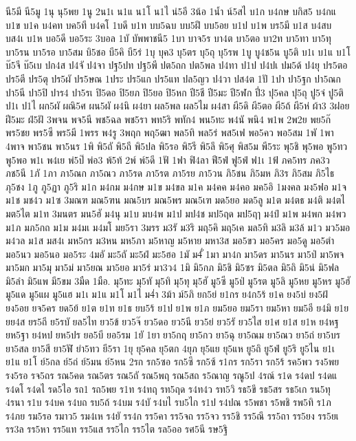 {นี5มี
นี5มู
1นุ
นุ5พย
1นู
2น1เ
น1แ
น1โ
น1ไ
น่5อี
3น้อ
1น้ำ
น์5สไ
บ1ก
บ4กษ
บกิส5
บ4กแ
บ1ข
บ1ค
บ4คท
บค5ที
บ4คโ
1บดี
บ1ท
บบ5ฉบ
บบ5ฝึ
บบ5อย
บ1ป
บ1พ
บร5มี
บ1ส
บ4สบ
บส4เ
บ1ห
บอ5ดี
บอ5ระ
3บอล
1บั
บัพพาชนี5
1บา
บาจ5ร
บา4ต
บา5ตอ
บา2ท
บา5ทา
บา5ทุ
บา5รน
บา5รอ
บา5สม
บิ5ชอ
บี5คิ
บี5ร่
1บุ
บุค3
บุ5ตร
บุ5ถุ
บุ5รพ
1บู
บู4ช5น
บู5ติ
บ1เ
บ1แ
บ1โ
บ๊5จี
บ๊5เบ
ปก4ส
ป4จั
ป4จา
ปฐ5ปท
ปฐ5พี
ปต5ถก
ปต5พล
ป4ทา
ป1ป
ป4ปเ
ปม5ด้
ป4ยุ
ปร5ตอ
ปร5ตี
ปร5ตุ
ปร5ผั
ปร5ษณ
1ประ
ปร5แก
ปร5แท
ปล5ญว
ป4วา
ปส4ต
1ปั
1ปา
ปา5ฐก
ปา5ณก
ปา5นี
ปา5ปิ
ปาร4
ปา5รเ
ปิ5ดอ
ปิ5ยภ
ปิ5ยอ
ปิ5หก
ปี5ชี
ปี5มะ
ปี5ฬก
ปี่3
ปุ5คล
ปุ5ถุ
ปู5จ๋
ปู5ติ
ป1เ
ป1ไ
ผก5ผั
ผณิ5ศ
ผน5ผั
ผ4นิ
ผ4ยา
ผล5พล
ผล5ไม
ผ4สา
ผี5ดิ
ผี5ตอ
ผี5ถ้
ผี5ห่
ผ้า3
3ฝอย
ฝี5มะ
ฝ่5ฝั
3พจน
พจ5นี
พช5ฉล
พช5รา
พท5ริ
พทัก4
พน5ทะ
พ4นั
พนิ4
พ1พ
2พ2ย
พย5ก๊
พร5ชย
พร5ซี
พร5มี
1พรร
พ4รู
3พฤก
พฤ5ฒา
พล5ทิ
พล5ร่
พส5เฟ
พอ5คว
พอ5สม
1พั
1พา
4พาจ
พา5ชน
พา5นร
1พิ
พิ5ถั
พิ5ถี
พิ5ปล
พิ5รอ
พิ5รี
พิ5ลึ
พิ5ศุ
พิส5ม
พี5ระ
พุ5ชิ
พุ5พอ
พู5ทว
พู5พอ
พ1เ
พ4เย
พ่5ป๊
พ่อ3
พ้5ท้
2พ์
พ์5ดี
1ฟั
1ฟา
ฟิ4ลา
ฟี5ฟ่
ฟู5ฟ่
ฟ1เ
1ฟ้
ภค5ทร
ภค3ว
ภช5นี
1ภั
1ภา
ภา5ณก
ภา5ณว
ภา5รด
ภา5รต
ภา5รย
ภา5วน
ภิ5ชน
ภิ5มห
ภิ3ร
ภิ5สม
ภิ5ไธ
ภุ5ชง
1ภู
ภู5ฏา
ภู5ริ
ม1ก
ม4กม
ม4กษ
ม1ข
ม4ขล
ม1ค
ม4คค
ม4คอ
มค5อิ
1มงคล
มง5ฟอ
ม1จ
ม1ช
มช4ว
ม1ซ
3มณฑ
มณ5ฑน
มณ5บร
มณ5พร
มณ5เฑ
มด5ยอ
มด5ลู
ม1ต
ม4ตธ
ม4ติ
ม4ตไ
มต5ไต
ม1ท
3มนตร
มน5ฮั
ม4นุ
ม1บ
มบ4พ
ม1ป
มป4ช
มป5ฤด
มป5ฤๅ
ม4ป์
ม1พ
ม4พก
ม4พว
ม1ภ
มภ5กถ
ม1ม
ม4มเ
ม4มโ
มย5รา
3มรร
ม3รั
ม3ริ
มฤ5คิ
มฤ5เค
มล5ทิ
ม3ลิ
ม3ล้
ม1ว
มว5มอ
ม4วล
ม1ส
มส4เ
มห5กร
ม3หน
มห5ภา
ม5หาญ
ม5หาย
มหา3ส
มอ5ขว
มอ5คร
มอ5ดู
มอ5ตำ
มอ5นว
มอ5นอ
มอ5ระ
4มอั
มะ5ถั
มะ5ฝ่
มะ5ฮอ
1มั
ม4ั่
1มา
มา4ก
มา5ดร
มา5นร
มา5ป่
มา5พจ
มา5มก
มา5มุ
มา5ม่
มา5ยณ
มา5ยอ
มา5ร่
มา3ว4
1มิ
มิ5กภ
มิ5ชิ
มิ5ซร
มิ5ตล
มิ5ถิ
มิ5น่
มิ5ฟล
มิ5ลำ
มิ5แพ
มี5ขม
3มืด
1มือ.
มุ5ทะ
มุ5ทั
มุ5ทิ
มุ5ทุ
มุ5ฮั
มู5ซี
มู5ป่
มู5รต
มู5ลิ
มู5หย
มู5หร
มู5ฮั
มู5แด
มู5แผ
มู5แฮ
ม1เ
ม1แ
ม1โ
ม1ไ
ม4่า
3ม้า
ม์5ภิ
ยก5ย่
ย1กร
ย4ก5ร้
ย1ค
ยง5บ่
ยง5ฝ้
ยง5อย
ยจ5คร
ยด5ย้
ย1ต
ย1ท
ย1ธ
ยบ5ร้
ย1ป
ย1พ
ย1ภ
ยม5ยอ
ยม5รา
ยม5หา
ยม5อี
ย4มิ
ย1ย
ยย4ส
ยร5ถี
ย5รบั
ยล5ไท
ยว5ข้
ยว5จ๊
ยว5ดอ
ยว5นี
ยว5ย่
ยว5รั
ยว5ไส
ย1ศ
ย1ส
ย1ห
ย4หฐ
ยห5ฐา
ย4หป
ยห5ปร
ยอ5บี
ยอ5รม
1ยั
1ยา
ยา5กฤ
ยา5กว
ยา5ฉุ
ยา5ณม
ยา5ณว
ยา5ถ่
ยา5บร
ยา5สล
ยา5สี
ยา5ฬั
ยำ5ทว
ยี5รา
1ยุ
ยุ5คล
ยุ5ตก
4ยุภ
ยุ5แย
ยุ5แห
ยู5ถิ
ยู5ฟ่
ยู5ริ
ยู5ไน
ย1เ
ย1แ
ย1โ
ย์5กล
ย์5ถ่
ย์5มน
ย์5หน
2รก
รก5ซอ
รก5ซึ
รก5ซ้
ร1กร
รก5รา
รก5ร้
รค5พว
รง5พย
รง5รอ
รจ5ถร
รณ5คด
รณ5ตร
รณ5ถั
รณ5พฤ
รณ5สถ
ร5ณาญ
รณู5ป
4รณ์
ร1ด
ร4ดป
ร4ดแ
ร4ดโ
ร4ดไ
รด5ไอ
รถ1
รถ5พย
ร1ท
ร4ทฤ
รท5ฤด
ร4ท4ว
รท5วิ
รธ5ขึ
รธ5สร
รธ5เก
รน5ทุ
4รนา
ร1บ
ร4บค
ร4บถ
รบ5ถ้
ร4บม
ร4บั
ร4บไ
รบ5ไก
ร1ป
ร4ปณ
ร5พชา
ร5พชิ
รพ5ทิ
ร1ภ
ร4ภย
รม5รอ
รมาว5
รม4เห
ร4ยั
รร4ก
รร5คา
รร5จถ
รร5จว
รร5ชิ
รร5ณึ
รร5ถา
รร5ยง
รร5ยเ
รร3ล
รร5หา
รร5แท
รร5แส
รร5ไก
รร5ไต
รล5ออ
รศ5นี
รษ5ฐิ
}
